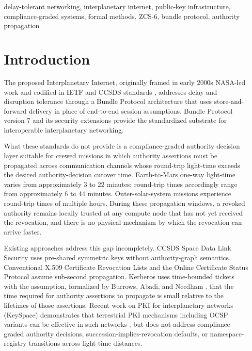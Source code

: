 \documentclass[conference]{IEEEtran}
\begin{document}
\begin{IEEEkeywords}
delay-tolerant networking, interplanetary internet, public-key infrastructure, compliance-graded systems, formal methods, ZCS-6, bundle protocol, authority propagation
\end{IEEEkeywords}

\section{Introduction}

The proposed Interplanetary Internet, originally framed in early 2000s NASA-led work and codified in IETF and CCSDS standards \cite{cerf2007dtn,burleigh2003dtn,burleigh2003ipn}, addresses delay and disruption tolerance through a Bundle Protocol architecture that uses store-and-forward delivery in place of end-to-end session assumptions. Bundle Protocol version 7 \cite{rfc9171} and its security extensions \cite{rfc9172,rfc9173} provide the standardized substrate for interoperable interplanetary networking.

What these standards do not provide is a compliance-graded authority decision layer suitable for crewed missions in which authority assertions must be propagated across communication channels whose round-trip light-time exceeds the desired authority-decision cutover time. Earth-to-Mars one-way light-time varies from approximately 3 to 22 minutes; round-trip times accordingly range from approximately 6 to 44 minutes. Outer-solar-system missions experience round-trip times of multiple hours. During these propagation windows, a revoked authority remains locally trusted at any compute node that has not yet received the revocation, and there is no physical mechanism by which the revocation can arrive faster.

Existing approaches address this gap incompletely. CCSDS Space Data Link Security uses pre-shared symmetric keys without authority-graph semantics. Conventional X.509 Certificate Revocation Lists \cite{rfc5280} and the Online Certificate Status Protocol \cite{rfc6960} assume sub-second propagation. Kerberos uses time-bounded tickets \cite{rfc4120} with the assumption, formalized by Burrows, Abadi, and Needham \cite{ban1989}, that the time required for authority assertions to propagate is small relative to the lifetimes of those assertions. Recent work on PKI for interplanetary networks (KeySpace) demonstrates that terrestrial PKI mechanisms including OCSP variants can be effective in such networks \cite{smailes2024keyspace}, but does not address compliance-graded authority decisions, succession-implies-revocation defaults, or namespace-registry transitions across light-time distances.
\end{document}
